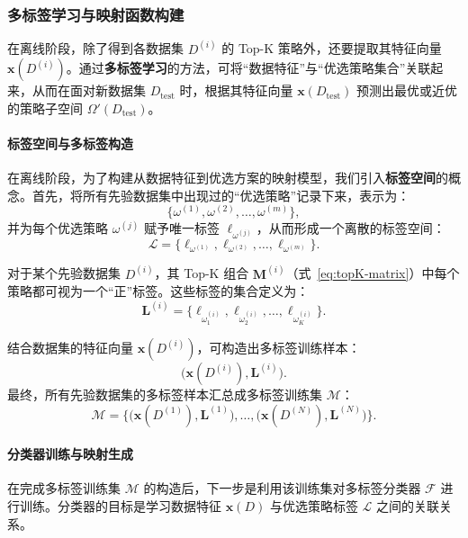 \documentclass[10pt]{article} %
\numberwithin{equation}{section}
\begin{document}
\subsubsection{多标签学习与映射函数构建}
\label{subsec:multi-label}

在离线阶段，除了得到各数据集 $D^{(i)}$ 的 Top-K 策略外，还要提取其特征向量 $\mathbf{x}(D^{(i)})$。通过\textbf{多标签学习}的方法，可将“数据特征”与“优选策略集合”关联起来，从而在面对新数据集 $D_{\text{test}}$ 时，根据其特征向量 $\mathbf{x}(D_{\text{test}})$ 预测出最优或近优的策略子空间 $\Omega'(D_{\text{test}})$。

\paragraph{标签空间与多标签构造}  
在离线阶段，为了构建从数据特征到优选方案的映射模型，我们引入\textbf{标签空间}的概念。首先，将所有先验数据集中出现过的“优选策略”记录下来，表示为：
\[
\{\omega^{(1)}, \omega^{(2)}, \ldots, \omega^{(m)}\},
\]
并为每个优选策略 $\omega^{(j)}$ 赋予唯一标签 $\ell_{\omega^{(j)}}$，从而形成一个离散的标签空间：
\begin{equation}\label{eq:label-space}
\mathcal{L}
= \{\ell_{\omega^{(1)}}, \ell_{\omega^{(2)}}, \ldots, \ell_{\omega^{(m)}}\}.
\end{equation}

对于某个先验数据集 $D^{(i)}$，其 Top-K 组合 $\mathbf{M}^{(i)}$（式~\eqref{eq:topK-matrix}）中每个策略都可视为一个“正”标签。这些标签的集合定义为：
\begin{equation}\label{eq:label-space-for-D}
\mathbf{L}^{(i)}
= \{\ell_{\omega_1^{(i)}}, \ell_{\omega_2^{(i)}}, \ldots, \ell_{\omega_K^{(i)}}\}.
\end{equation}

结合数据集的特征向量 $\mathbf{x}(D^{(i)})$，可构造出多标签训练样本：
\[
\bigl(\mathbf{x}(D^{(i)}), \mathbf{L}^{(i)}\bigr).
\]
最终，所有先验数据集的多标签样本汇总成多标签训练集 $\mathcal{M}$：
\begin{equation}\label{eq:training-set}
\mathcal{M}
= \bigl\{\bigl(\mathbf{x}(D^{(1)}), \mathbf{L}^{(1)}\bigr), \ldots, \bigl(\mathbf{x}(D^{(N)}), \mathbf{L}^{(N)}\bigr)\bigr\}.
\end{equation}

\paragraph{分类器训练与映射生成}  
在完成多标签训练集 $\mathcal{M}$ 的构造后，下一步是利用该训练集对多标签分类器 $\mathcal{F}$ 进行训练。分类器的目标是学习数据特征 $\mathbf{x}(D)$ 与优选策略标签 $\mathcal{L}$ 之间的关联关系。
\end{document}
